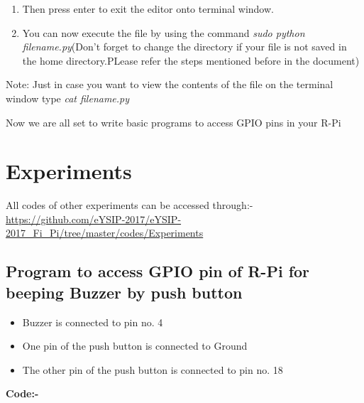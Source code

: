\documentclass[11pt,a4paper]{report}
\begin{document}
\begin{flushleft}
\begin{enumerate}
\begin{itemize}
\begin{enumerate}
				\item Then press enter to exit the editor onto terminal window.
				\item You can now execute the file by using the command \textit{sudo python filename.py}(Don't forget to change the directory if your file is not saved in the home directory.PLease refer the steps mentioned before in the document)
			\end{enumerate}
			Note: Just in case you want to view the contents of the file on the terminal window type \textit{cat filename.py}
		\end{itemize}				
	\end{enumerate}
	\vspace{0.3cm}
	Now we are all set to write basic programs to access GPIO pins in your R-Pi
	
	\newpage
	\section{Experiments}
	All codes of other experiments can be accessed through:- \url{https://github.com/eYSIP-2017/eYSIP-2017_Fi_Pi/tree/master/codes/Experiments}
	\subsection{Program to access GPIO pin of R-Pi for beeping Buzzer by push button}
	
		 \begin{itemize}
	 	\item Buzzer is connected to pin no. 4

	 	\item One pin of the push button is connected to Ground
	   	\item The other pin of the push button is connected to pin no. 18
	\end{itemize}

	\newpage
	\flushleft
	\textbf{Code:-}
	\vspace{0.3cm}
	
	\newpage

\end{flushleft}
\end{document}
